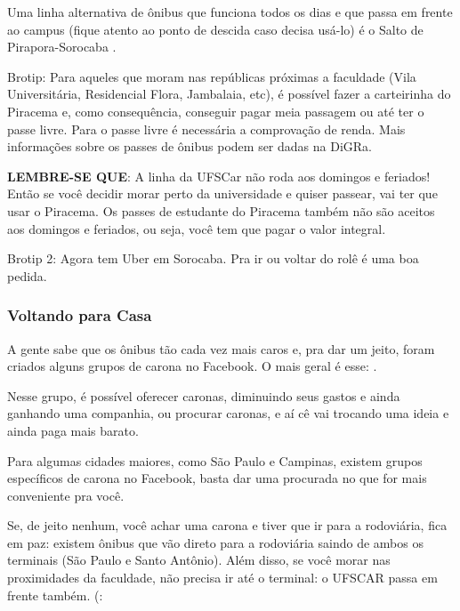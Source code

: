 Uma linha alternativa de ônibus que funciona todos os dias e que passa em frente ao campus (fique atento ao ponto de descida caso decisa usá-lo) é o Salto de Pirapora-Sorocaba .


Brotip: Para aqueles que moram nas repúblicas próximas a faculdade (Vila Universitária, Residencial Flora, Jambalaia, etc), é possível fazer a carteirinha do Piracema e, como consequência, conseguir pagar meia passagem ou até ter o passe livre. Para o passe livre é necessária a comprovação de renda. Mais informações sobre os passes de ônibus podem ser dadas na DiGRa.

\textbf{LEMBRE-SE QUE}: A linha da UFSCar não roda aos domingos e feriados! Então se você decidir morar perto da universidade e quiser passear, vai ter que usar o Piracema. Os passes de estudante do Piracema também não são aceitos aos domingos e feriados, ou seja, você tem que pagar o valor integral.

Brotip 2: Agora tem Uber em Sorocaba. Pra ir ou voltar do rolê é uma boa pedida.

\subsubsection{Voltando para Casa}
A gente sabe que os ônibus tão cada vez mais caros e, pra dar um jeito, foram
criados alguns grupos de carona no Facebook. O mais geral é esse:
.

Nesse grupo, é possível oferecer caronas, diminuindo seus gastos e ainda ganhando uma companhia, ou procurar caronas, e aí cê vai trocando uma ideia e ainda paga mais barato.

Para algumas cidades maiores, como São Paulo e Campinas, existem grupos específicos de carona no Facebook, basta dar uma procurada no que for mais conveniente pra você.

Se, de jeito nenhum, você achar uma carona e tiver que ir para a rodoviária, fica em paz: existem ônibus que vão direto para a rodoviária saindo de ambos os terminais (São Paulo e Santo Antônio). Além disso, se você morar nas proximidades da faculdade, não precisa ir até o terminal: o UFSCAR passa em frente também. (:


